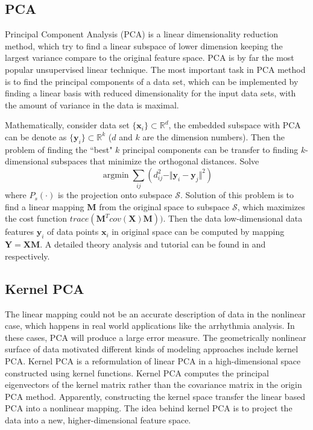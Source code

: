 \documentclass[journal]{IEEEtran}
\DeclareMathOperator*{\argmin}{argmin}
\begin{document}
%
%

\subsection{PCA}
Principal Component Analysis (PCA) is a linear dimensionality reduction method, which try to find a linear subspace of lower dimension keeping the largest variance compare to the original feature space.
PCA is by far the most popular unsupervised linear technique.
The most important task in PCA method is to find the principal components of a data set, which can be implemented by finding a linear basis with reduced dimensionality for the input data sets, with the amount of variance in the data is maximal.

Mathematically, consider data set $\{\boldsymbol{x}_i\} \subset \mathbb{R}^d$, the embedded subspace with PCA can be denote as $\{\boldsymbol{y}_i\} \subset \mathbb{R}^k$ ($d$ and $k$ are the dimension numbers). 
Then the problem of finding the ``best"  $k$ principal components can be transfer to finding $k$-dimensional subspaces that minimize the orthogonal distances.
Solve 
\begin{equation}
\label{equPCA}
\argmin \sum_{ij} (d_{ij}^2 - \Vert \bm{y}_i - \bm{y}_j \Vert^2)
\end{equation}
where $P_s(\cdot)$ is the projection onto subspace $\mathcal{S}$.
Solution of this problem is to find a linear mapping $\boldsymbol{M}$ from the original space to subspace $\mathcal{S}$, which maximizes the cost function $trace(\boldsymbol{M}^Tcov(\boldsymbol{X})\boldsymbol{M}))$. Then the data low-dimensional data features $\boldsymbol{y}_i$ of data points $\boldsymbol{x}_i$ in original space can be computed by mapping $\boldsymbol{Y} = \boldsymbol{X} \boldsymbol{M}$.
A detailed theory analysis and tutorial can be found in \cite{abdi2010principal} and \cite{shlens2014tutorial} respectively. 


%
%

\subsection{Kernel PCA}
The linear mapping could not be an accurate description of data in the nonlinear case, which happens in real world applications like the arrhythmia analysis.
In these cases, PCA will produce a large error measure. 
The geometrically nonlinear surface of data motivated different kinds of modeling approaches include kernel PCA.
Kernel PCA is a reformulation of linear PCA in a high-dimensional space constructed using kernel functions.
Kernel PCA computes the principal eigenvectors of the kernel matrix rather than the covariance matrix in the origin PCA method.
Apparently, constructing the kernel space transfer the linear based PCA into a nonlinear mapping.
The idea behind kernel PCA is to project the data into a new, higher-dimensional feature space.
\end{document}
